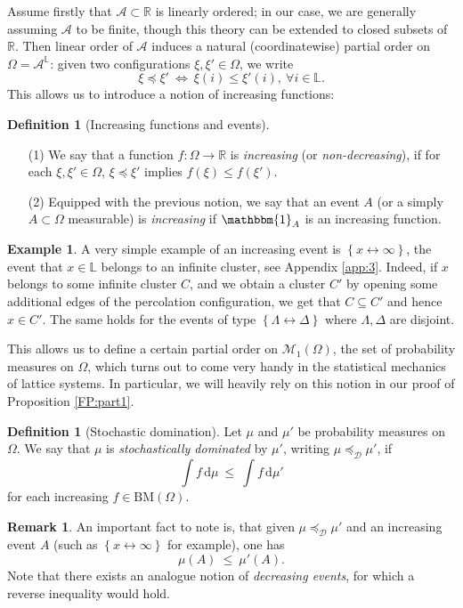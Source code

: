 \documentclass[12pt]{article}
\newcommand{\A}{\mathcal{A}}
\newcommand{\D}{\mathcal{D}}
\renewcommand{\d}{\mathrm{d}}
\renewcommand{\L}{\mathbb{L}}
\newcommand{\M}{\mathcal{M}}
\newcommand{\R}{\mathbb{R}}
\newcommand{\BM}{\mathrm{BM}}
\newcommand{\set}[1]{\left\{#1\right\}}
\newcommand{\ra}{\rightarrow}
\newcommand{\1}{\mathbbm{1}}
\newcommand{\5}{\vspace{0.5cm}}
\theoremstyle{definition}
\newtheorem{ex}[thm]{Example}
\newtheorem{df}[thm]{Definition}
\newtheorem{rem}[thm]{Remark}
\begin{document}
Assume firstly that $\A\subset\R$ is linearly ordered; in our case, we are generally assuming $\A$ to be finite, though this theory can be extended to closed subsets of $\R$. Then linear order of $\A$ induces a natural (coordinatewise) partial order on $\Omega=\A^\L$: given two configurations $\xi,\xi'\in\Omega$, we write
$$\xi\preceq\xi' ~\iff~ \xi(i)\leq\xi'(i),~\forall i\in\L.$$
This allows us to introduce a notion of increasing functions:

\begin{df}[Increasing functions and events]
~
\begin{itemize}
	\item[(1)] We say that a function $f:\Omega\ra\R$ is \textit{increasing} (or \textit{non-decreasing}), if for each $\xi,\xi'\in\Omega$, $\xi\preceq\xi'$ implies $f(\xi)\leq f(\xi')$. 
	\item[(2)] Equipped with the previous notion, we say that an event $A$ (or a simply $A\subset\Omega$ measurable) is \textit{increasing} if $\1_A$ is an increasing function.
\end{itemize}
\end{df}

\begin{ex}
A very simple example of an increasing event is $\set{x\leftrightarrow\infty}$, the event that $x\in\L$ belongs to an infinite cluster, see Appendix \ref{app:3}. Indeed, if $x$ belongs to some infinite cluster $C$, and we obtain a cluster $C'$ by opening some additional edges of the percolation configuration, we get that $C\subseteq C'$ and hence $x\in C'$. The same holds for the events of type $\set{\Lambda\leftrightarrow\Delta}$ where $\Lambda,\Delta$ are disjoint.
\end{ex}

 This allows us to define a certain partial order on $\M_1(\Omega)$, the set of probability measures on $\Omega$, which turns out to come very handy in the statistical mechanics of lattice systems. In particular, we will heavily rely on this notion in our proof of Proposition \ref{FP:part1}.
 
\begin{df}[Stochastic domination]
Let $\mu$ and $\mu'$ be probability measures on $\Omega$. We say that $\mu$ is \textit{stochastically dominated} by $\mu'$, writing $\mu\preceq_\D\mu'$, if
$$\int f\,\d\mu ~\leq~ \int f\,\d\mu'$$
for each increasing $f\in\BM(\Omega)$.
\end{df}

\begin{rem}
An important fact to note is, that given $\mu\preceq_\D\mu'$ and an increasing event $A$ (such as $\set{x\leftrightarrow\infty}$ for example), one has 
$$\mu(A) ~\leq~ \mu'(A).$$
Note that there exists an analogue notion of \textit{decreasing events}, for which a reverse inequality would hold.
\end{rem}
\end{document}

